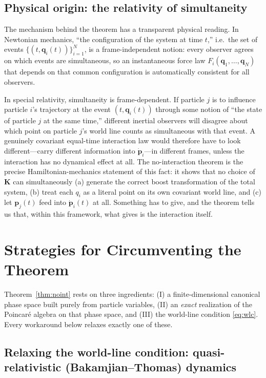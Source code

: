 \documentclass[11pt]{article}
\newcommand{\bq}{\mathbf{q}}
\newcommand{\bp}{\mathbf{p}}
\newcommand{\bK}{\mathbf{K}}
\begin{document}
\subsection{Physical origin: the relativity of simultaneity}

The mechanism behind the theorem has a transparent physical reading. In Newtonian mechanics, ``the configuration of the system at time $t$,'' i.e.\ the set of events $\{(t,\bq_i(t))\}_{i=1}^N$, is a frame-independent notion: every observer agrees on which events are simultaneous, so an instantaneous force law $F_i(\bq_1,\dots,\bq_N)$ that depends on that common configuration is automatically consistent for all observers.

In special relativity, simultaneity is frame-dependent. If particle $j$ is to influence particle $i$'s trajectory at the event $(t,\bq_i(t))$ through some notion of ``the state of particle $j$ at the same time,'' different inertial observers will disagree about which point on particle $j$'s world line counts as simultaneous with that event. A genuinely covariant equal-time interaction law would therefore have to look different---carry different information into $\dot{\bp}_i$---in different frames, unless the interaction has no dynamical effect at all. The no-interaction theorem is the precise Hamiltonian-mechanics statement of this fact: it shows that no choice of $\bK$ can simultaneously (a) generate the correct boost transformation of the total system, (b) treat each $q_i$ as a literal point on its own covariant world line, and (c) let $\bp_j(t)$ feed into $\dot{\bp}_i(t)$ at all. Something has to give, and the theorem tells us that, within this framework, what gives is the interaction itself.

\section{Strategies for Circumventing the Theorem}
\label{sec:workarounds}

Theorem~\ref{thm:noint} rests on three ingredients: (I) a finite-dimensional canonical phase space built purely from particle variables, (II) an \emph{exact} realization of the Poincar\'e algebra on that phase space, and (III) the world-line condition \eqref{eq:wlc}. Every workaround below relaxes exactly one of these.

\subsection{Relaxing the world-line condition: quasi-relativistic (Bakamjian--Thomas) dynamics}
\label{sec:BT}
\end{document}
